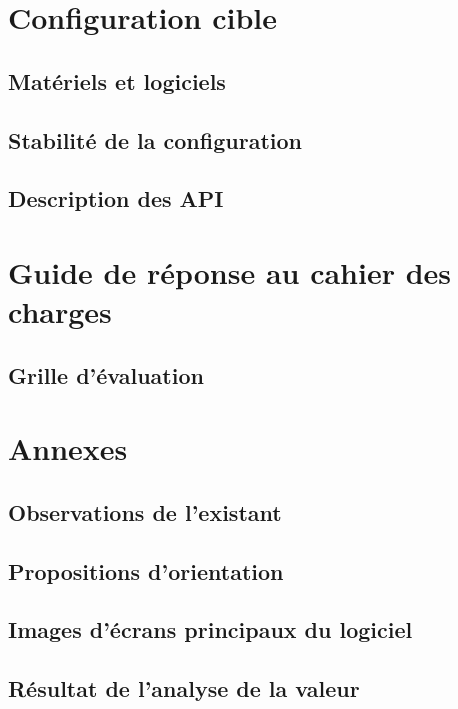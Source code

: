 \section{Configuration cible}
\subsection{Matériels et logiciels}
\subsection{Stabilité de la configuration}
\subsection{Description des API}

\section{Guide de réponse au cahier des charges}
\subsection{Grille d'évaluation}

\section{Annexes}
\subsection{Observations de l'existant}
\subsection{Propositions d'orientation}
\subsection{Images d'écrans principaux du logiciel}
\subsection{Résultat de l'analyse de la valeur}